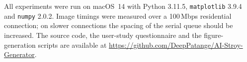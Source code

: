 \begin{appendices}
All experiments were run on macOS~14 with Python 3.11.5, \texttt{matplotlib} 3.9.4 and \texttt{numpy} 2.0.2. Image timings were measured over a 100\,Mbps residential connection; on slower connections the spacing of the serial queue should be increased. The source code, the user-study questionnaire and the figure-generation scripts are available at \url{https://github.com/DeepPatange/AI-Stroy-Generator}.

\end{appendices}
